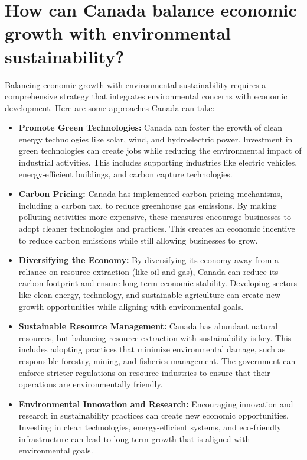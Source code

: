 \documentclass{article}
\begin{document}
\section{How can Canada balance economic growth with environmental sustainability?}

Balancing economic growth with environmental sustainability requires a comprehensive strategy that integrates environmental concerns with economic development. Here are some approaches Canada can take:

\begin{itemize}
    \item \textbf{Promote Green Technologies:} Canada can foster the growth of clean energy technologies like solar, wind, and hydroelectric power. Investment in green technologies can create jobs while reducing the environmental impact of industrial activities. This includes supporting industries like electric vehicles, energy-efficient buildings, and carbon capture technologies.
    
    \item \textbf{Carbon Pricing:} Canada has implemented carbon pricing mechanisms, including a carbon tax, to reduce greenhouse gas emissions. By making polluting activities more expensive, these measures encourage businesses to adopt cleaner technologies and practices. This creates an economic incentive to reduce carbon emissions while still allowing businesses to grow.
    
    \item \textbf{Diversifying the Economy:} By diversifying its economy away from a reliance on resource extraction (like oil and gas), Canada can reduce its carbon footprint and ensure long-term economic stability. Developing sectors like clean energy, technology, and sustainable agriculture can create new growth opportunities while aligning with environmental goals.
    
    \item \textbf{Sustainable Resource Management:} Canada has abundant natural resources, but balancing resource extraction with sustainability is key. This includes adopting practices that minimize environmental damage, such as responsible forestry, mining, and fisheries management. The government can enforce stricter regulations on resource industries to ensure that their operations are environmentally friendly.
    
    \item \textbf{Environmental Innovation and Research:} Encouraging innovation and research in sustainability practices can create new economic opportunities. Investing in clean technologies, energy-efficient systems, and eco-friendly infrastructure can lead to long-term growth that is aligned with environmental goals.
    

\end{itemize}
\end{document}
